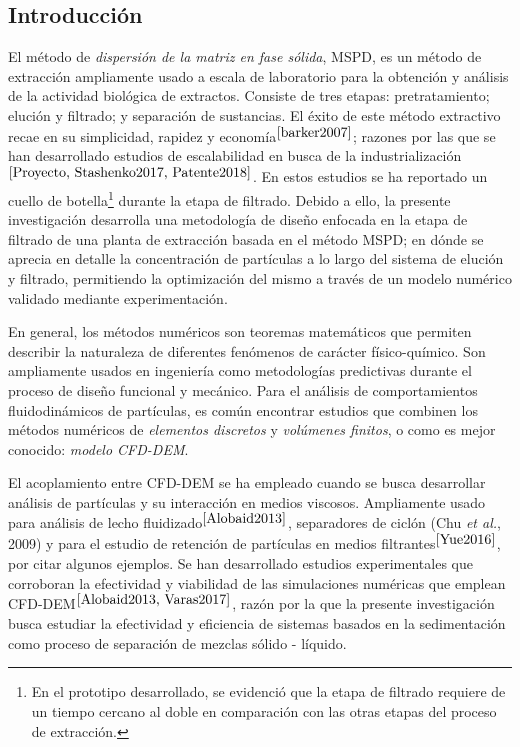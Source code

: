 \begin{center}
	\section{Introducci\'on}
\end{center}

\noindent
\justify

El m\'etodo de \textit{dispersi\'on de la matriz en fase s\'olida}, MSPD, es un m\'etodo de extracci\'on ampliamente usado a escala de laboratorio para la obtenci\'on y an\'alisis de la actividad biol\'ogica de extractos. Consiste de tres etapas: pretratamiento; eluci\'on y filtrado; y separaci\'on de sustancias. El \'exito de este m\'etodo extractivo recae en su simplicidad, rapidez y econom\'ia$^{\cite{barker2007}}$; razones por las que se han desarrollado estudios de escalabilidad en busca de la industrializaci\'on$^{\cite{Proyecto, Stashenko2017, Patente2018}}$. En estos estudios se ha reportado un cuello de botella\footnote{En el prototipo desarrollado, se evidenci\'o que la etapa de filtrado requiere de un tiempo cercano al doble en comparaci\'on con las otras etapas del proceso de extracci\'on.} durante la etapa de filtrado. Debido a ello, la presente investigaci\'on desarrolla una metodolog\'ia de dise\~no enfocada en la etapa de filtrado de una planta de extracci\'on basada en el m\'etodo MSPD; en d\'onde se aprecia en detalle la concentraci\'on de part\'iculas a lo largo del sistema de eluci\'on y filtrado, permitiendo la optimizaci\'on del mismo a trav\'es de un modelo num\'erico validado mediante experimentaci\'on.

\noindent
\justify

En general, los m\'etodos num\'ericos son teoremas matem\'aticos que permiten describir la naturaleza de diferentes fen\'omenos de car\'acter f\'isico-qu\'imico. Son ampliamente usados en ingenier\'ia como metodolog\'ias predictivas durante el proceso de dise\~no funcional y mec\'anico. Para el an\'alisis de comportamientos fluidodin\'amicos de part\'iculas, es com\'un encontrar estudios que combinen los m\'etodos num\'ericos de \textit{elementos discretos} y \textit{vol\'umenes finitos}, o como es mejor conocido: \textit{modelo CFD-DEM}.

\noindent
\justify

El acoplamiento entre CFD-DEM se ha empleado cuando se busca desarrollar an\'alisis de part\'iculas y su interacci\'on en medios viscosos. Ampliamente usado para an\'alisis de lecho fluidizado$^{\cite{Alobaid2013}}$, separadores de cicl\'on (Chu \textit{et al.}, 2009) y para el estudio de retenci\'on de part\'iculas en medios filtrantes$^{\cite{Yue2016}}$, por citar algunos ejemplos. Se han desarrollado estudios experimentales que corroboran la efectividad y viabilidad de las simulaciones num\'ericas que emplean CFD-DEM$^{\cite{Alobaid2013, Varas2017}}$, raz\'on por la que la presente investigaci\'on busca estudiar la efectividad y eficiencia de sistemas basados en la sedimentaci\'on como proceso de separaci\'on de mezclas s\'olido - l\'iquido.

\noindent
\justify

